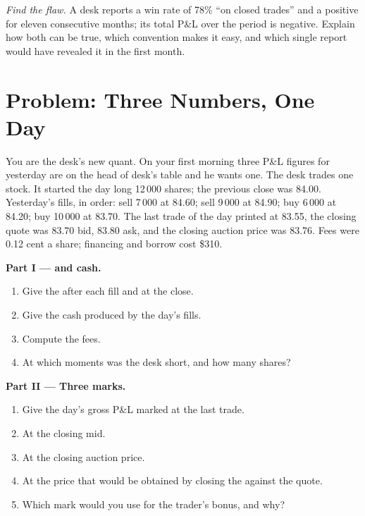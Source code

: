 \begin{exercise}[$\star\star\star$]\label{exo:m1:pnl-and-positions:8}
\emph{Find the flaw.} A desk reports a win rate of 78\% ``on closed trades''
and a positive  for eleven consecutive months; its total P\&L
over the period is negative. Explain how both can be true, which convention
makes it easy, and which single report would have revealed it in the first
month.
\end{exercise}

\section{Problem: Three Numbers, One Day}

\begin{problem}\label{pb:m1:pnl-and-positions:1}
You are the desk's new quant. On your first morning three P\&L figures for
yesterday are on the head of desk's table and he wants one. The desk trades
one stock. It started the day long 12\,000 shares; the previous close was
84.00. Yesterday's fills, in order: sell 7\,000 at 84.60; sell 9\,000 at
84.90; buy 6\,000 at 84.20; buy 10\,000 at 83.70. The last trade of the day
printed at 83.55, the closing quote was 83.70 bid, 83.80 ask, and the closing
auction price was 83.76. Fees were 0.12 cent a share; financing and borrow
cost \$310.

\medskip\noindent\textbf{Part I ---  and cash.}
\begin{enumerate}
\item Give the  after each fill and at the close.
\item Give the cash produced by the day's fills.
\item Compute the fees.
\item At which moments was the desk short, and how many shares?
\end{enumerate}

\medskip\noindent\textbf{Part II --- Three marks.}
\begin{enumerate}[resume]
\item Give the day's gross P\&L marked at the last trade.
\item At the closing mid.
\item At the closing auction price.
\item At the price that would be obtained by closing the  against
the quote.
\item Which mark would you use for the trader's bonus, and why?
\end{enumerate}


\end{problem}
